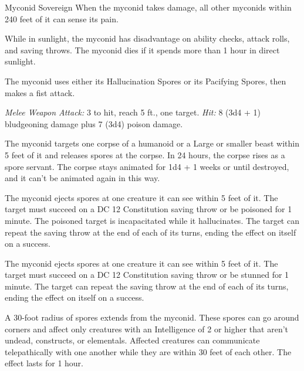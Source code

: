 \documentclass[10pt,a4paper,twoside,bg=print,twocolumn,openany,nodeprecatedcode]{dndbook}
\begin{document}
\begin{DndMonster}[float=t]{Myconid Sovereign}
\DndMonsterBasics[
armor-class = {13 (natural armor)},
hit-points = {\DndDice{8d10 + 16}},
speed = {30 ft.}
]
\DndMonsterAbilityScores[
 str = 12,
 dex = 10,
 con = 14,
 int = 13,
 wis = 15,
 cha = 10
]
\DndMonsterDetails[
senses = {darkvision 120 ft., passive perception 12},
challenge = 2,
]
When the myconid takes damage, all other myconids within 240 feet of it can sense its pain.

While in sunlight, the myconid has disadvantage on ability checks, attack rolls, and saving throws. The myconid dies if it spends more than 1 hour in direct sunlight.

The myconid uses either its Hallucination Spores or its Pacifying Spores, then makes a fist attack.

\textsl{Melee Weapon Attack:} 3 to hit, reach 5 ft., one target. \textsl{Hit:} 8 (3d4 + 1) bludgeoning damage plus 7 (3d4) poison damage.

The myconid targets one corpse of a humanoid or a Large or smaller beast within 5 feet of it and releases spores at the corpse. In 24 hours, the corpse rises as a spore servant. The corpse stays animated for 1d4 + 1 weeks or until destroyed, and it can't be animated again in this way.

The myconid ejects spores at one creature it can see within 5 feet of it. The target must succeed on a DC 12 Constitution saving throw or be poisoned for 1 minute. The poisoned target is incapacitated while it hallucinates. The target can repeat the saving throw at the end of each of its turns, ending the effect on itself on a success.

The myconid ejects spores at one creature it can see within 5 feet of it. The target must succeed on a DC 12 Constitution saving throw or be stunned for 1 minute. The target can repeat the saving throw at the end of each of its turns, ending the effect on itself on a success.

A 30-foot radius of spores extends from the myconid. These spores can go around corners and affect only creatures with an Intelligence of 2 or higher that aren't undead, constructs, or elementals. Affected creatures can communicate telepathically with one another while they are within 30 feet of each other. The effect lasts for 1 hour.

\end{DndMonster}
\end{document}
